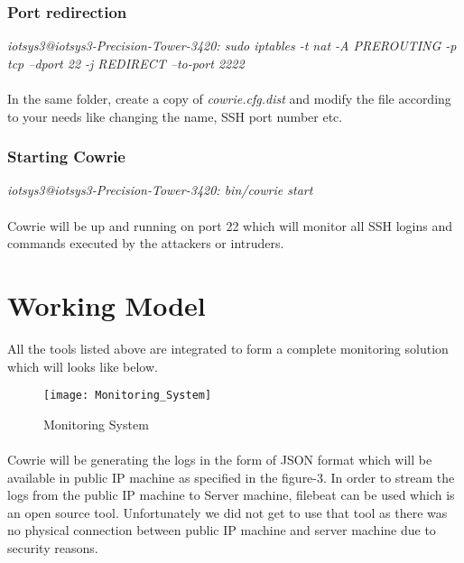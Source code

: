 \documentclass{article}
\begin{document}
\subsubsection{Port redirection } 
\textit{{\color{blue}iotsys3@iotsys3-Precision-Tower-3420:} sudo iptables -t nat -A PREROUTING -p tcp --dport 22 -j REDIRECT --to-port 2222}

\paragraph{}
In the same folder, create a copy of \textit{cowrie.cfg.dist} and modify the file according to your needs like changing the name, SSH port number etc. 

\subsubsection{Starting Cowrie }
\textit{{\color{blue}iotsys3@iotsys3-Precision-Tower-3420:} bin/cowrie start}

\paragraph{}
Cowrie will be up and running on port 22 which will monitor all SSH logins and commands executed by the attackers or intruders.


\section{Working Model}

All the tools listed above are integrated to form a complete monitoring solution which will looks like below.

\begin{figure}[H]
\centering
\caption{Monitoring System}
\texttt{[image: Monitoring\_System]}
\end{figure}

\paragraph{}
Cowrie will be generating the logs in the form of JSON format which will be available in public IP machine as specified in the figure-3. In order to stream the logs from the public IP machine to Server machine, filebeat can be used which is an open source tool. Unfortunately we did not get to use that tool as there was no physical connection between public IP machine and server machine due to security reasons. 
\end{document}
